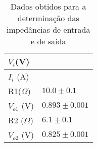 \documentclass[%
  reprint,
  nofootinbib,
  amsmath,amssymb,
  aps,
  10pt,
  a4paper
]{revtex4-1}
\begin{document}
\begin{table}[h]
    \begin{tabular}{|l|l|}
    \hline
    $V_i $(V) & ~ \\ \hline
    $I_i$ (A) & ~ \\ \hline
    R1($\Omega$)    & $10.0\pm 0.1$ \\ \hline
    $V_{o1}$ (V)   & $0.893 \pm 0.001$ \\ \hline
    R2 ($\Omega$)   & $6.1\pm 0.1$ \\ \hline
    $V_{o2}$ (V)   & $0.825\pm 0.001$ \\ \hline
    \end{tabular}
\caption{Dados obtidos para a determinação das impedâncias de entrada e de saída}
\label{tab:impedanciadados}
\end{table}
\end{document}
